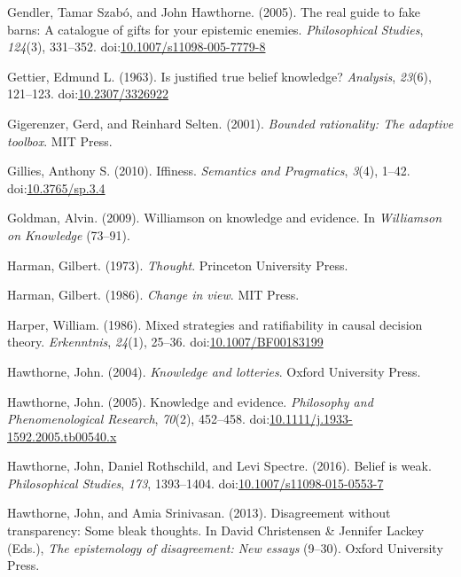 \documentclass[
  12pt,
  letterpaper,
]{scrbook}
\newlength{\cslhangindent}
\newenvironment{CSLReferences}[2] %
 {\begin{list}{}{%
  \setlength{\itemindent}{0pt}
  \setlength{\leftmargin}{0pt}
  \setlength{\parsep}{0pt}
  \ifodd #1
   \setlength{\leftmargin}{\cslhangindent}
   \setlength{\itemindent}{-1\cslhangindent}
  \fi
  \setlength{\itemsep}{#2\baselineskip}}}
 {\end{list}}
\begin{document}
\begin{CSLReferences}{1}{0}
Gendler, Tamar Szabó, and John Hawthorne. (2005). The real guide to fake
barns: A catalogue of gifts for your epistemic enemies.
\emph{Philosophical Studies}, \emph{124}(3), 331--352.
doi:\href{https://doi.org/10.1007/s11098-005-7779-8}{10.1007/s11098-005-7779-8}

Gettier, Edmund L. (1963). Is justified true belief knowledge?
\emph{Analysis}, \emph{23}(6), 121--123.
doi:\href{https://doi.org/10.2307/3326922}{10.2307/3326922}

Gigerenzer, Gerd, and Reinhard Selten. (2001). \emph{Bounded
rationality: The adaptive toolbox}. MIT Press.

Gillies, Anthony S. (2010). Iffiness. \emph{Semantics and Pragmatics},
\emph{3}(4), 1--42.
doi:\href{https://doi.org/10.3765/sp.3.4}{10.3765/sp.3.4}

Goldman, Alvin. (2009). Williamson on knowledge and evidence. In
\emph{{Williamson on Knowledge}} (73--91).

Harman, Gilbert. (1973). \emph{Thought}. Princeton University Press.

Harman, Gilbert. (1986). \emph{Change in view}. {MIT} Press.

Harper, William. (1986). Mixed strategies and ratifiability in causal
decision theory. \emph{Erkenntnis}, \emph{24}(1), 25--36.
doi:\href{https://doi.org/10.1007/BF00183199}{10.1007/BF00183199}

Hawthorne, John. (2004). \emph{Knowledge and lotteries}. Oxford
University Press.

Hawthorne, John. (2005). Knowledge and evidence. \emph{Philosophy and
Phenomenological Research}, \emph{70}(2), 452--458.
doi:\href{https://doi.org/10.1111/j.1933-1592.2005.tb00540.x}{10.1111/j.1933-1592.2005.tb00540.x}

Hawthorne, John, Daniel Rothschild, and Levi Spectre. (2016). Belief is
weak. \emph{Philosophical Studies}, \emph{173}, 1393--1404.
doi:\href{https://doi.org/10.1007/s11098-015-0553-7}{10.1007/s11098-015-0553-7}

Hawthorne, John, and Amia Srinivasan. (2013). Disagreement without
transparency: Some bleak thoughts. In David Christensen \& Jennifer
Lackey (Eds.), \emph{The epistemology of disagreement: New essays}
(9--30). Oxford University Press.


\end{CSLReferences}
\end{document}
